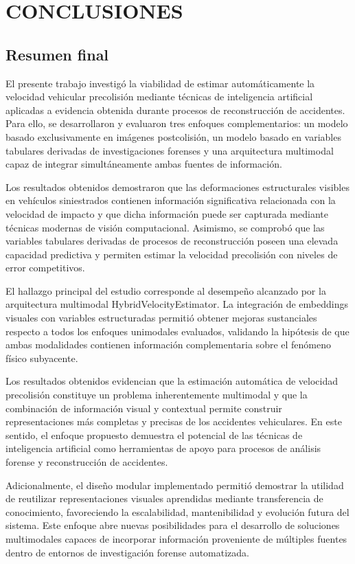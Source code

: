 \documentclass[esp]{SpeedEstimationAI_paper}
\begin{document}
\section{CONCLUSIONES}

\subsection{Resumen final}

El presente trabajo investigó la viabilidad de estimar automáticamente la velocidad vehicular precolisión mediante técnicas de inteligencia artificial aplicadas a evidencia obtenida durante procesos de reconstrucción de accidentes. Para ello, se desarrollaron y evaluaron tres enfoques complementarios: un modelo basado exclusivamente en imágenes postcolisión, un modelo basado en variables tabulares derivadas de investigaciones forenses y una arquitectura multimodal capaz de integrar simultáneamente ambas fuentes de información.

Los resultados obtenidos demostraron que las deformaciones estructurales visibles en vehículos siniestrados contienen información significativa relacionada con la velocidad de impacto y que dicha información puede ser capturada mediante técnicas modernas de visión computacional. Asimismo, se comprobó que las variables tabulares derivadas de procesos de reconstrucción poseen una elevada capacidad predictiva y permiten estimar la velocidad precolisión con niveles de error competitivos.

El hallazgo principal del estudio corresponde al desempeño alcanzado por la arquitectura multimodal HybridVelocityEstimator. La integración de embeddings visuales con variables estructuradas permitió obtener mejoras sustanciales respecto a todos los enfoques unimodales evaluados, validando la hipótesis de que ambas modalidades contienen información complementaria sobre el fenómeno físico subyacente.

Los resultados obtenidos evidencian que la estimación automática de velocidad precolisión constituye un problema inherentemente multimodal y que la combinación de información visual y contextual permite construir representaciones más completas y precisas de los accidentes vehiculares. En este sentido, el enfoque propuesto demuestra el potencial de las técnicas de inteligencia artificial como herramientas de apoyo para procesos de análisis forense y reconstrucción de accidentes.

Adicionalmente, el diseño modular implementado permitió demostrar la utilidad de reutilizar representaciones visuales aprendidas mediante transferencia de conocimiento, favoreciendo la escalabilidad, mantenibilidad y evolución futura del sistema. Este enfoque abre nuevas posibilidades para el desarrollo de soluciones multimodales capaces de incorporar información proveniente de múltiples fuentes dentro de entornos de investigación forense automatizada.
\end{document}
